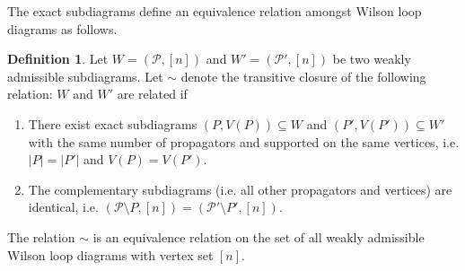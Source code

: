 \documentclass[11pt]{article}
\newcommand{\cP}{\mathcal{P}}
\theoremstyle{remark}
\theoremstyle{definition}
\newtheorem{dfn}[thm]{Definition}
\begin{document}
The exact subdiagrams define an equivalence relation amongst Wilson loop diagrams as follows.

\begin{dfn}\label{equivdfn} 
Let $W = (\cP,[n])$ and $W' = (\cP',[n])$ be two weakly admissible subdiagrams. Let $\sim$ denote the transitive closure of the following relation: $W$ and $W'$ are related if
\begin{enumerate}
\item There exist exact subdiagrams $(P, V(P)) \subseteq W$ and $(P', V(P')) \subseteq W'$ with the same number of propagators and supported on the same vertices, i.e. $|P| = |P'|$ and  $V(P) =  V(P')$.
\item The complementary subdiagrams (i.e. all other propagators and vertices) are identical, i.e. $(\cP \setminus P, [n]) = (\cP' \setminus P', [n])$.
\end{enumerate}
The relation $\sim$ is an equivalence relation on the set of all weakly admissible Wilson loop diagrams with vertex set $[n]$.
\end{dfn}
\end{document}
